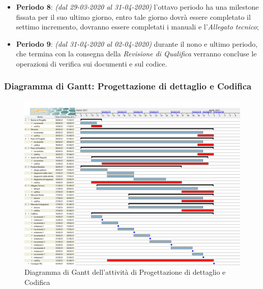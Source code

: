 \begin{itemize}
\item \textbf{Periodo 8}: \textit{(dal 29-03-2020 al 31-04-2020)} l'ottavo periodo ha una milestone fissata per il suo ultimo giorno, entro tale giorno dovrà essere completato il settimo incremento, dovranno essere completati i manuali e l'\textit{Allegato tecnico};

\item \textbf{Periodo 9}: \textit{(dal 31-04-2020 al 02-04-2020)} durante il nono e ultimo periodo, che termina con la consegna della \textit{Revisione di Qualifica} verranno concluse le operazioni di verifica sui documenti e sul codice.

\end{itemize}

\subsubsection{Diagramma di Gantt: Progettazione di dettaglio e Codifica}
\begin{figure}[h]
 	\centering
	\includegraphics[scale=0.35]{Images/GanttPianificazioneProgettazioneDettaglioCodifica.png}
	\caption{Diagramma di Gantt dell'attività di Progettazione di dettaglio e Codifica}
\end{figure}
